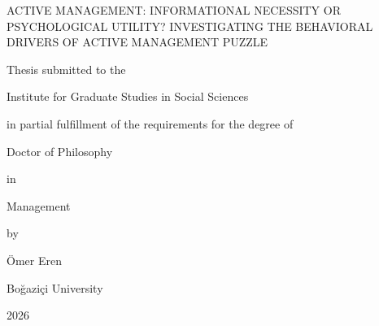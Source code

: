 \documentclass[12pt, a4paper]{article}
\begin{document}
\begin{center}

\vspace*{1.2in}

ACTIVE MANAGEMENT: INFORMATIONAL NECESSITY OR PSYCHOLOGICAL UTILITY?
INVESTIGATING THE BEHAVIORAL DRIVERS OF ACTIVE MANAGEMENT PUZZLE

\vspace{0.5in}

Thesis submitted to the

Institute for Graduate Studies in Social Sciences

in partial fulfillment of the requirements for the degree of

\vspace{0.5in}

Doctor of Philosophy

in

Management

\vspace{0.5in}

by

Ömer Eren

\vspace{0.5in}

Boğaziçi University

2026

\end{center}
\end{document}
